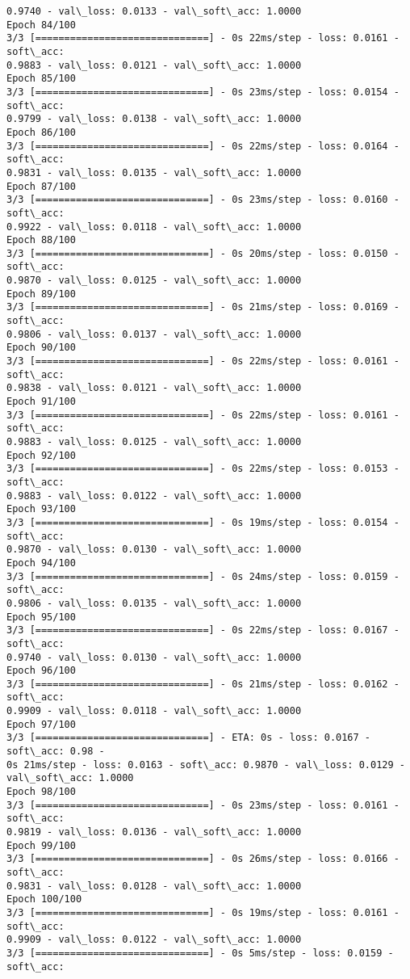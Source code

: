 \documentclass[11pt]{article}
\begin{document}
\begin{Verbatim}[commandchars=\\\{\}]
0.9740 - val\_loss: 0.0133 - val\_soft\_acc: 1.0000
Epoch 84/100
3/3 [==============================] - 0s 22ms/step - loss: 0.0161 - soft\_acc:
0.9883 - val\_loss: 0.0121 - val\_soft\_acc: 1.0000
Epoch 85/100
3/3 [==============================] - 0s 23ms/step - loss: 0.0154 - soft\_acc:
0.9799 - val\_loss: 0.0138 - val\_soft\_acc: 1.0000
Epoch 86/100
3/3 [==============================] - 0s 22ms/step - loss: 0.0164 - soft\_acc:
0.9831 - val\_loss: 0.0135 - val\_soft\_acc: 1.0000
Epoch 87/100
3/3 [==============================] - 0s 23ms/step - loss: 0.0160 - soft\_acc:
0.9922 - val\_loss: 0.0118 - val\_soft\_acc: 1.0000
Epoch 88/100
3/3 [==============================] - 0s 20ms/step - loss: 0.0150 - soft\_acc:
0.9870 - val\_loss: 0.0125 - val\_soft\_acc: 1.0000
Epoch 89/100
3/3 [==============================] - 0s 21ms/step - loss: 0.0169 - soft\_acc:
0.9806 - val\_loss: 0.0137 - val\_soft\_acc: 1.0000
Epoch 90/100
3/3 [==============================] - 0s 22ms/step - loss: 0.0161 - soft\_acc:
0.9838 - val\_loss: 0.0121 - val\_soft\_acc: 1.0000
Epoch 91/100
3/3 [==============================] - 0s 22ms/step - loss: 0.0161 - soft\_acc:
0.9883 - val\_loss: 0.0125 - val\_soft\_acc: 1.0000
Epoch 92/100
3/3 [==============================] - 0s 22ms/step - loss: 0.0153 - soft\_acc:
0.9883 - val\_loss: 0.0122 - val\_soft\_acc: 1.0000
Epoch 93/100
3/3 [==============================] - 0s 19ms/step - loss: 0.0154 - soft\_acc:
0.9870 - val\_loss: 0.0130 - val\_soft\_acc: 1.0000
Epoch 94/100
3/3 [==============================] - 0s 24ms/step - loss: 0.0159 - soft\_acc:
0.9806 - val\_loss: 0.0135 - val\_soft\_acc: 1.0000
Epoch 95/100
3/3 [==============================] - 0s 22ms/step - loss: 0.0167 - soft\_acc:
0.9740 - val\_loss: 0.0130 - val\_soft\_acc: 1.0000
Epoch 96/100
3/3 [==============================] - 0s 21ms/step - loss: 0.0162 - soft\_acc:
0.9909 - val\_loss: 0.0118 - val\_soft\_acc: 1.0000
Epoch 97/100
3/3 [==============================] - ETA: 0s - loss: 0.0167 - soft\_acc: 0.98 -
0s 21ms/step - loss: 0.0163 - soft\_acc: 0.9870 - val\_loss: 0.0129 -
val\_soft\_acc: 1.0000
Epoch 98/100
3/3 [==============================] - 0s 23ms/step - loss: 0.0161 - soft\_acc:
0.9819 - val\_loss: 0.0136 - val\_soft\_acc: 1.0000
Epoch 99/100
3/3 [==============================] - 0s 26ms/step - loss: 0.0166 - soft\_acc:
0.9831 - val\_loss: 0.0128 - val\_soft\_acc: 1.0000
Epoch 100/100
3/3 [==============================] - 0s 19ms/step - loss: 0.0161 - soft\_acc:
0.9909 - val\_loss: 0.0122 - val\_soft\_acc: 1.0000
3/3 [==============================] - 0s 5ms/step - loss: 0.0159 - soft\_acc:

\end{Verbatim}
\end{document}

